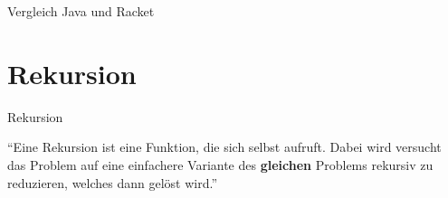 \documentclass{../tuda-beamer}
\begin{document}
  \begin{frame}{Vergleich Java und Racket}
    \begin{minipage}[t]{.5\linewidth}
      
    \end{minipage}
    \hfill
    \begin{minipage}[t]{.475\linewidth}
      
    \end{minipage}
  \end{frame}


  \section{Rekursion}
  \begin{frame}[c]{Rekursion}
    \begin{center}
      \enquote{Eine Rekursion ist eine Funktion, die sich selbst aufruft. Dabei wird versucht das
      Problem auf eine einfachere Variante des \textbf{gleichen} Problems rekursiv zu reduzieren,
        welches dann gelöst wird.}
    \end{center}
  \end{frame}
\end{document}
